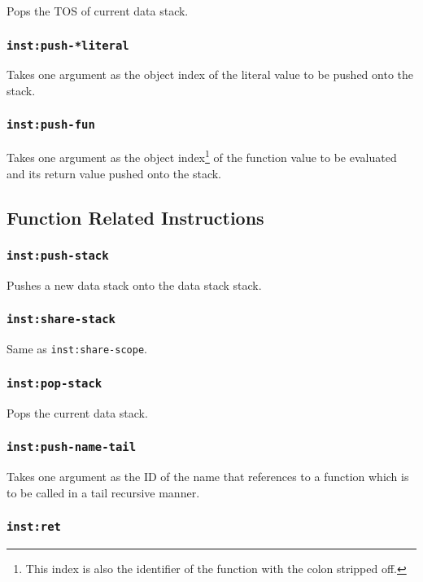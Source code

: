 \documentclass{article}
\newcommand{\inst}[1] {\texttt{inst:#1}}
\begin{document}
Pops the TOS of current data stack.

\subsubsection{\inst{push-*literal}}

Takes one argument as the object index of the literal value to be pushed onto the stack.

\subsubsection{\inst{push-fun}}

Takes one argument as the object index\footnote{This index is also the identifier of the function with the colon stripped off.} of the function value to be evaluated and its return value pushed onto the stack.

\subsection{Function Related Instructions}

\subsubsection{\inst{push-stack}}

Pushes a new data stack onto the data stack stack.

\subsubsection{\inst{share-stack}}

Same as \inst{share-scope}.

\subsubsection{\inst{pop-stack}}

Pops the current data stack.

\subsubsection{\inst{push-name-tail}}

Takes one argument as the ID of the name that references to a function which is to be called in a tail recursive manner.

\subsubsection{\inst{ret}}
\end{document}
